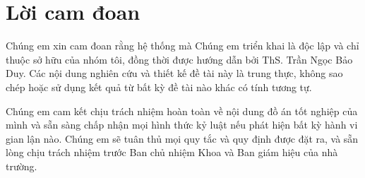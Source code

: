 \section*{Lời cam đoan}
\thispagestyle{frontmatter}

Chúng em xin cam đoan rằng hệ thống mà Chúng em triển khai là độc lập và chỉ
thuộc sở hữu của nhóm tôi, đồng thời được hướng dẫn bởi ThS. Trần Ngọc Bảo Duy. Các
nội dung nghiên cứu và thiết kế đề tài này là trung thực, không sao chép hoặc sử dụng
kết quả từ bất kỳ đề tài nào khác có tính tương tự.

Chúng em cam kết chịu trách nhiệm hoàn toàn về nội dung đồ án tốt nghiệp của
mình và sẵn sàng chấp nhận mọi hình thức kỷ luật nếu phát hiện bất kỳ hành vi gian lận
nào. Chúng em sẽ tuân thủ mọi quy tắc và quy định được đặt ra, và sẵn lòng chịu trách
nhiệm trước Ban chủ nhiệm Khoa và Ban giám hiệu của nhà trường.

\clearpage
